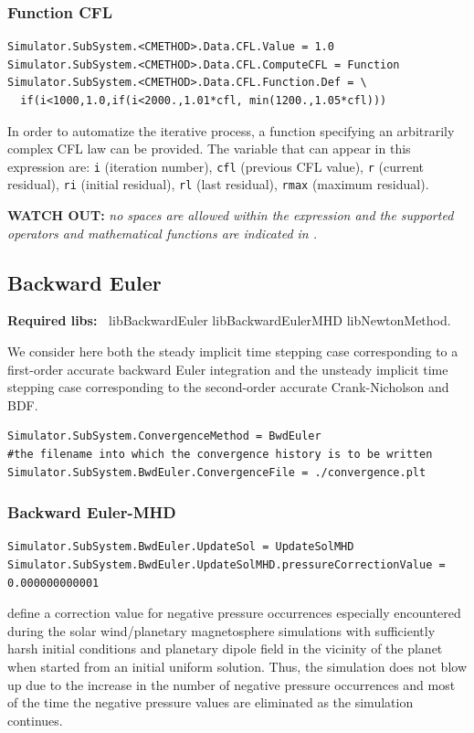 \documentclass[11pt]{article}
\begin{document}
\subsubsection{Function CFL}

\begin{lstlisting}[breaklines]   
Simulator.SubSystem.<CMETHOD>.Data.CFL.Value = 1.0
Simulator.SubSystem.<CMETHOD>.Data.CFL.ComputeCFL = Function
Simulator.SubSystem.<CMETHOD>.Data.CFL.Function.Def = \
  if(i<1000,1.0,if(i<2000.,1.01*cfl, min(1200.,1.05*cfl)))
\end{lstlisting}
In order to automatize the iterative process, a function specifying an arbitrarily complex CFL law can be provided.
The variable that can appear in this expression are: {\tt i} (iteration number), {\tt cfl} (previous CFL value), 
{\tt r} (current residual), {\tt ri} (initial residual), {\tt rl} (last residual), 
{\tt rmax} (maximum residual).

{\bf WATCH OUT:} {\it no spaces are allowed within the expression and the supported operators and mathematical functions
  are indicated in \cite{FParser}.}

\subsection{Backward Euler}

{\bf Required libs:~} libBackwardEuler libBackwardEulerMHD libNewtonMethod.

We consider here both the steady implicit time stepping case corresponding to a first-order accurate backward Euler integration and the unsteady implicit time stepping case corresponding to the second-order accurate Crank-Nicholson and BDF.

\begin{lstlisting}[breaklines]
Simulator.SubSystem.ConvergenceMethod = BwdEuler
#the filename into which the convergence history is to be written
Simulator.SubSystem.BwdEuler.ConvergenceFile = ./convergence.plt
\end{lstlisting}

\subsubsection{Backward Euler-MHD}

\begin{lstlisting}[breaklines]
Simulator.SubSystem.BwdEuler.UpdateSol = UpdateSolMHD
Simulator.SubSystem.BwdEuler.UpdateSolMHD.pressureCorrectionValue = 0.000000000001
\end{lstlisting}
define a correction value for negative pressure occurrences especially encountered during the solar wind/planetary magnetosphere simulations with sufficiently harsh initial conditions and planetary dipole field in the vicinity of the planet when started from an initial uniform solution. Thus, the simulation does not blow up due to the increase in the number of negative pressure occurrences and most of the time the negative pressure values are eliminated as the simulation continues.
\end{document}
